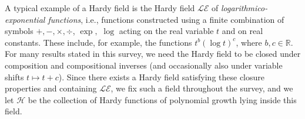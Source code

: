 \documentclass[11pt]{amsart}
\theoremstyle{definition}
\newcommand{\R}{{\mathbb R}}
\newcommand{\CE}{{\mathcal E}}
\newcommand{\CH}{{\mathcal H}}
\newcommand{\CL}{{\mathcal L}}
\newcommand{\1}{{\mathbf{1}}}
\begin{document}
A typical example of a Hardy field is the Hardy field $\mathcal{LE}$ of \emph{logarithmico-exponential functions}, i.e., functions constructed using a finite combination of symbols $+, -, \times, \div$, $\exp,$ $\log$ acting on the real variable $t$ and on real constants. These include, for example,  the functions $t^b (\log{t})^c$, where $b,c\in \R$. For many results stated in this survey, we need the Hardy field to be closed under composition and compositional inverses (and occasionally also under variable shifts $t\mapsto t + c$). Since there exists a Hardy field satisfying these closure properties and containing $\CL\CE$, we fix such a field throughout the survey, and we let $\CH$ be the collection of Hardy functions of polynomial growth lying inside this field.
    
  

\end{document}
